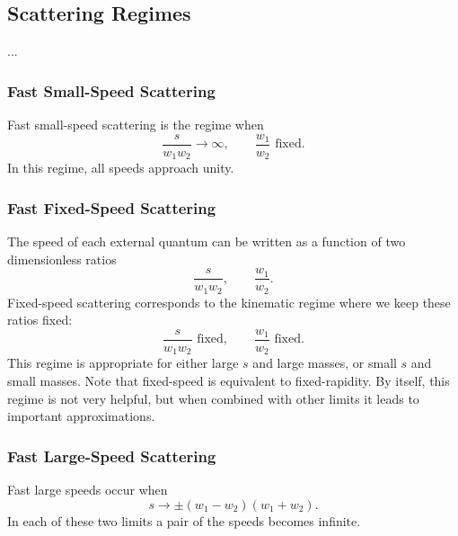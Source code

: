 \subsection{Scattering Regimes}
...
\subsubsection{Fast Small-Speed Scattering}
Fast small-speed scattering is the regime when
\begin{equation}
	\frac{s}{w_{1} w_{2}} \rightarrow \infty, \qquad \frac{w_{1}}{w_{2}} \text{ fixed}.
\end{equation}
In this regime, all speeds approach unity.
\subsubsection{Fast Fixed-Speed Scattering}
The speed of each external quantum can be written as a function of two dimensionless ratios
\begin{equation}
	\frac{s}{w_{1} w_{2}}, \qquad \frac{w_{1}}{w_{2}}.
\end{equation}
Fixed-speed scattering corresponds to the kinematic regime where we keep these ratios fixed:
\begin{equation}
	\frac{s}{w_{1} w_{2}} \text{ fixed}, \qquad \frac{w_{1}}{w_{2}} \text{ fixed}.
\end{equation}
This regime is appropriate for either large $s$ and large masses, or small $s$ and small masses. Note that fixed-speed is equivalent to fixed-rapidity. By itself, this regime is not very helpful, but when combined with other limits it leads to important approximations.
\subsubsection{Fast Large-Speed Scattering}
Fast large speeds occur when
\begin{equation}
	s \rightarrow \pm \left(w_{1} - w_{2}\right)\left(w_{1} + w_{2}\right).
\end{equation}
In each of these two limits a pair of the speeds becomes infinite.
